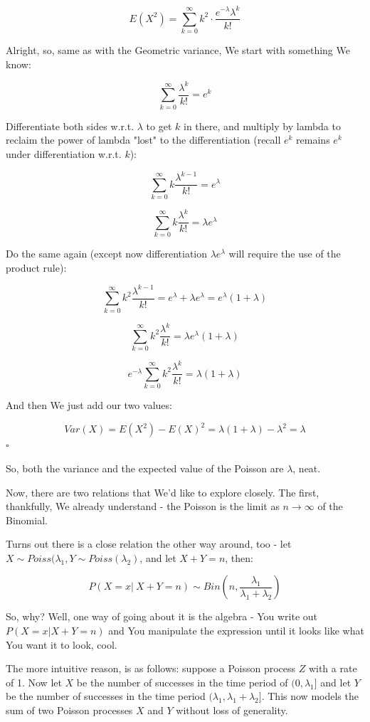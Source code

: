 \documentclass{article}
\newcommand{\qed}{\hfill$\square$}
\begin{document}
		\[ E(X^2) = \sum^\infty_{k = 0} k^2\cdot \frac{e^{-\lambda}\lambda^k}{k!} \]
		
		Alright, so, same as with the Geometric variance, We start with something We know:
		
		\[ \sum^\infty_{k=0} \frac{\lambda^k}{k!} = e^k \]
		
		Differentiate both sides w.r.t. $\lambda$ to get $k$ in there, and multiply by lambda to reclaim the power of lambda "lost" to the differentiation (recall $e^k$ remains $e^k$ under differentiation w.r.t. $k$):
		
		\[ \sum^\infty_{k=0} k\frac{\lambda^{k-1}}{k!} = e^\lambda \]
		
		\[ \sum^\infty_{k=0} k\frac{\lambda^{k}}{k!} = \lambda e^\lambda \]
		
		Do the same again (except now differentiation $\lambda e^\lambda$ will require the use of the product rule):
		
		\[ \sum^\infty_{k=0} k^2\frac{\lambda^{k-1}}{k!} = e^\lambda + \lambda e^\lambda = e^\lambda(1+\lambda)\]
		
		\[ \sum^\infty_{k=0} k^2\frac{\lambda^{k}}{k!} = \lambda e^\lambda(1+\lambda)\]
		
		\[ e^{-\lambda} \sum^\infty_{k=0} k^2\frac{\lambda^{k}}{k!} = \lambda(1+\lambda)\]
		
		And then We just add our two values:
		
		\[Var(X) = E(X^2) - E(X)^2 = \lambda(1+\lambda) - \lambda^2 = \lambda \] \qed
		
		So, both the variance and the expected value of the Poisson are $\lambda$, neat.
		
		Now, there are two relations that We'd like to explore closely. The first, thankfully, We already understand - the Poisson is the limit as $n\to\infty$ of the Binomial.
		
		Turns out there is a close relation the other way around, too - let $X\sim Poiss(\lambda_1, Y\sim Poiss(\lambda_2)$, and let $X+Y=n$, then:
		
		\[ P(X = x |\ X + Y = n)\sim Bin\left(n, \frac{\lambda_1}{\lambda_1+\lambda_2}\right) \]
		
		So, why? Well, one way of going about it is the algebra - You write out $P(X = x\vert X+Y=n)$ and You manipulate the expression until it looks like what You want it to look, cool.
		
		The more intuitive reason, is as follows: suppose a Poisson process $Z$ with a rate of 1. Now let $X$ be the number of successes in the time period of $(0, \lambda_1]$ and let $Y$ be the number of successes in the time period $(\lambda_1, \lambda_1+\lambda_2]$. This now models the sum of two Poisson processes $X$ and $Y$ without loss of generality.
		
\end{document}
